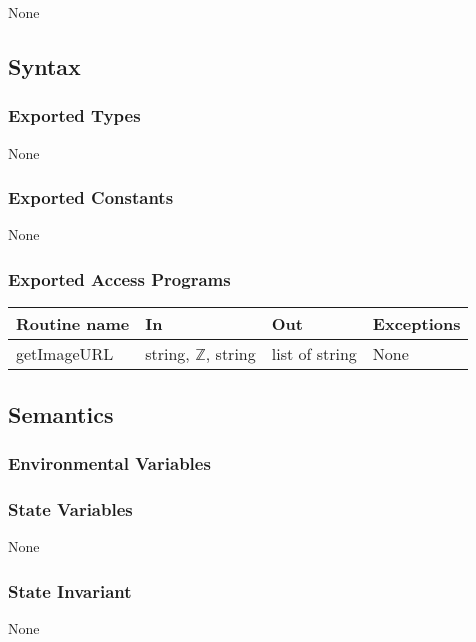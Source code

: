 \documentclass{article}
\begin{document}
None

\subsection* {Syntax}

\subsubsection* {Exported Types}

None

\subsubsection* {Exported Constants}

None

\subsubsection* {Exported Access Programs}

\begin{tabular}{| l | l | l | p{5cm} |}
\hline
\textbf{Routine name} & \textbf{In} & \textbf{Out} & \textbf{Exceptions}\\
\hline
getImageURL & string, $\mathbb{Z}$\color{red}, string& list of string & None \\
\hline

\end{tabular}

\subsection* {Semantics}

\subsubsection* {Environmental Variables}



\subsubsection* {State Variables}

None

\subsubsection* {State Invariant}

None
\end{document}
